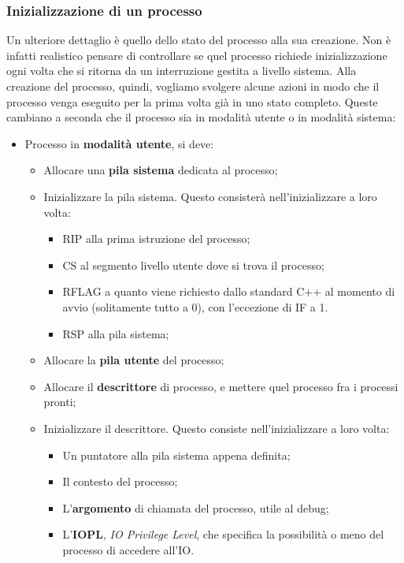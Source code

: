 \documentclass[a4paper,11pt]{article}
\begin{document}
\subsubsection{Inizializzazione di un processo}
Un ulteriore dettaglio è quello dello stato del processo alla sua creazione.
Non è infatti realistico pensare di controllare se quel processo richiede inizializzazione ogni volta che si ritorna da un interruzione gestita a livello sistema.
Alla creazione del processo, quindi, vogliamo svolgere alcune azioni in modo che il processo venga eseguito per la prima volta già in uno stato completo.
Queste cambiano a seconda che il processo sia in modalità utente o in modalità sistema:
\begin{itemize}
	\item Processo in \textbf{modalità utente}, si deve:
		\begin{itemize}
			\item Allocare una \textbf{pila sistema} dedicata al processo;
			\item Inizializzare la pila sistema. Questo consisterà nell'inizializzare a loro volta: 
				\begin{itemize}
					\item RIP alla prima istruzione del processo;
					\item CS al segmento livello utente dove si trova il processo;
					\item RFLAG a quanto viene richiesto dallo standard C++ al momento di avvio (solitamente tutto a 0), con l'eccezione di IF a 1.
					\item RSP alla pila sistema;
				\end{itemize}
			\item Allocare la \textbf{pila utente} del processo;
			\item Allocare il \textbf{descrittore} di processo, e mettere quel processo fra i processi pronti;
			\item Inizializzare il descrittore. Questo consiste nell'inizializzare a loro volta:
				\begin{itemize}
					\item Un puntatore alla pila sistema appena definita;
					\item Il contesto del processo;
					\item L'\textbf{argomento} di chiamata del processo, utile al debug;
					\item L'\textbf{IOPL}, \textit{IO Privilege Level}, che specifica la possibilità o meno del processo di accedere all'IO.
				\end{itemize}

\end{itemize}
\end{itemize}
\end{document}
